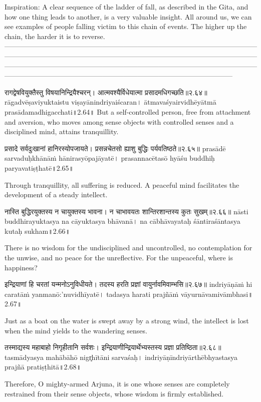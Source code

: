 Inspiration:
A clear sequence of the ladder of fall, as described in the Gita, and how one thing leads to another, is a very valuable insight. All around us, we can see examples of people falling victim to this chain of events. The higher up the chain, the harder it is to reverse.
—-----------------------------------------------------------------------------------------------------------------------------------------------------------------------------------------------------------------------------------------------------------------------------------------------------------------------------------------------------------------------------------------------------------------------------------


रागद्वेषवियुक्तैस्तु विषयानिन्द्रियैश्चरन्।
आत्मवश्यैर्विधेयात्मा प्रसादमधिगच्छति॥२.६४॥
rāgadvēṣaviyuktaistu viṣayānindriyaiścaran।
ātmavaśyairvidhēyātmā prasādamadhigacchati॥2.64॥
But a self-controlled person, free from attachment and aversion, who moves among sense objects with controlled senses and a disciplined mind, attains tranquillity.


प्रसादे सर्वदुःखानां हानिरस्योपजायते।
प्रसन्नचेतसो ह्याशु बुद्धिः पर्यवतिष्ठते॥२.६५॥
prasādē sarvaduḥkhānāṁ hānirasyōpajāyatē।
prasannacētasō hyāśu buddhiḥ paryavatiṣṭhatē॥2.65॥

Through tranquillity, all suffering is reduced. A peaceful mind facilitates the development of a steady intellect.


नास्ति बुद्धिरयुक्तस्य न चायुक्तस्य भावना।
 न चाभावयतः शान्तिरशान्तस्य कुतः सुखम्॥२.६६॥
nāsti buddhirayuktasya na cāyuktasya bhāvanā।
na cābhāvayataḥ śāntiraśāntasya kutaḥ sukham॥2.66॥

There is no wisdom for the undisciplined and uncontrolled, no contemplation for the unwise, and no peace for the unreflective. For the unpeaceful, where is happiness?


इन्द्रियाणां हि चरतां यन्मनोऽनुविधीयते। 
तदस्य हरति प्रज्ञां वायुर्नावमिवाम्भसि॥२.६७॥
indriyāṇāṁ hi caratāṁ yanmanō:'nuvidhīyatē। 
tadasya harati prajñāṁ vāyurnāvamivāmbhasi॥2.67॥


Just as a boat on the water is swept away by a strong wind, the intellect is lost when the mind yields to the wandering senses.  


तस्माद्यस्य महाबाहो निगृहीतानि सर्वशः। 
इन्द्रियाणीन्द्रियार्थेभ्यस्तस्य प्रज्ञा प्रतिष्ठिता॥२.६८॥
tasmādyasya mahābāhō nigr̥hītāni sarvaśaḥ। 
indriyāṇīndriyārthēbhyastasya prajñā pratiṣṭhitā॥2.68॥

Therefore, O mighty-armed Arjuna, it is one whose senses are completely restrained from their sense objects, whose wisdom is firmly established.

